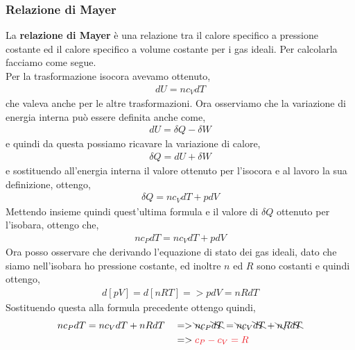             \subsubsection{Relazione di Mayer}
                La \textbf{relazione di Mayer} è una relazione tra il calore specifico a pressione costante ed il calore specifico a volume costante per i gas ideali. Per calcolarla facciamo come segue.\\
                Per la trasformazione isocora avevamo ottenuto,
                \begin{align*}
                    dU=nc_VdT
                \end{align*}
                che valeva anche per le altre trasformazioni. Ora osserviamo che la variazione di energia interna può essere definita anche come,
                \begin{align*}
                    dU=\delta Q - \delta W
                \end{align*}
                e quindi da questa possiamo ricavare la variazione di calore,
                \begin{align*}
                    \delta Q =dU+\delta W
                \end{align*}
                e sostituendo all'energia interna il valore ottenuto per l'isocora e al lavoro la sua definizione, ottengo,
                \begin{align*}
                    \delta Q=nc_VdT + pdV
                \end{align*}
                Mettendo insieme quindi quest'ultima formula e il valore di $\delta Q$ ottenuto per l'isobara, ottengo che,
                \begin{align*}
                    nc_PdT=nc_VdT + pdV
                \end{align*}
                Ora posso osservare che derivando l'equazione di stato dei gas ideali, dato che siamo nell'isobara ho pressione costante, ed inoltre $n$ ed $R$ sono costanti e quindi ottengo,
                \begin{align*}
                    d[pV] = d[nRT] => pdV = nRdT
                \end{align*}
                Sostituendo questa alla formula precedente ottengo quindi,
                \begin{align*}
                    &nc_PdT=nc_VdT + nRdT && =>  \bcancel{n}c_P \bcancel{dT} =\bcancel{n}c_V \bcancel{dT} + \bcancel{n}R \bcancel{dT}\\
                    & && => \textcolor{Red}{c_P - c_V = R}
                \end{align*}

